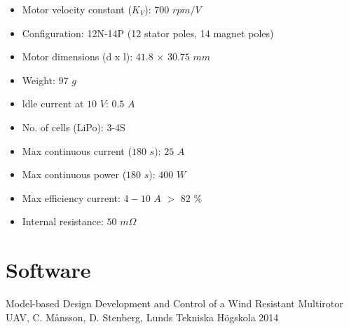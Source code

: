 \documentclass[a4paper]{article}
\begin{document}
\begin{itemize}
  \item Motor velocity constant ($K_V$): $700$ $rpm/V$
  \item Configuration: 12N-14P (12 stator poles, 14 magnet poles) 
  \item Motor dimensions (d x l): $41.8$ $\times$ $30.75$ $mm$
  \item Weight: $97$ $g$
  \item ldle current at $10$ $V$: $0.5$ $A$
  \item No. of cells (LiPo): 3-4S
  \item Max continuous current ($180$ $s$): $25$ $A$
  \item Max continuous power ($180$ $s$): $400$ $W$
  \item Max efficiency current: $4-10$ $A$ $>$ $82$ \%
  \item Internal resistance: $50$ $m\Omega$
\end{itemize}

\section{Software}

\begin{thebibliography}{99}
 Model-based Design Development and Control of a Wind Resistant Multirotor UAV, C. Månsson, D. Stenberg, Lunds Tekniska Högskola 2014
\end{thebibliography}
\end{document}
